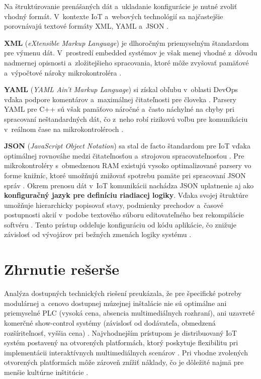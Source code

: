 Na štruktúrovanie prenášaných dát a~ukladanie konfigurácie
je nutné zvoliť vhodný formát. V~kontexte IoT a~webových
technológií sa najčastejšie porovnávajú textové formáty XML,
YAML a~JSON \cite{iot_data_formats_review}.

\textbf{XML} (\textit{eXtensible Markup Language}) je dlhoročným
priemyselným štandardom pre výmenu dát. V~prostredí embedded
systémov je však menej vhodné z~dôvodu nadmernej opisnosti
a~zložitejšieho spracovania, ktoré môže zvyšovať pamäťové
a~výpočtové nároky mikrokontroléra \cite{iot_data_formats_review}.

\textbf{YAML} (\textit{YAML Ain't Markup Language}) si získal
obľubu v~oblasti DevOps vďaka podpore komentárov
a~maximálnej čitateľnosti pre človeka \cite{yaml_vs_json}.
Parsery YAML pre C++ sú však pamäťovo náročné a~často
náchylné na chyby pri spracovaní neštandardných dát, čo z~neho
robí rizikovú voľbu pre komunikáciu v~reálnom čase na
mikrokontroléroch \cite{json_xml}.

\textbf{JSON} (\textit{JavaScript Object Notation}) sa stal de facto
štandardom pre IoT vďaka optimálnej rovnováhe medzi
čitateľnosťou a~strojovou spracovateľnosťou
\cite{iot_data_formats_review}. Pre mikrokontroléry
s~obmedzenou RAM existujú vysoko optimalizované parsery vo forme knižníc,
ktoré umožňujú znižovať spotrebu pamäte pri spracovaní
JSON správ \cite{arduinojson_reduce_memory}. Okrem prenosu
dát v~IoT komunikácii nachádza JSON uplatnenie aj ako
\textbf{konfiguračný jazyk pre definíciu riadiacej logiky}.
Vďaka svojej štruktúre umožňuje hierarchicky
popisovať stavy, podmienky prechodov a~časové postupnosti
akcií v~podobe textového súboru editovateľného bez
rekompilácie softvéru \cite{iot_data_formats_review}.
Tento prístup oddeľuje konfiguráciu od kódu aplikácie,
čo znižuje závislosť od vývojárov pri bežných zmenách
logiky systému \cite{iot_data_formats_review}.

\section{Zhrnutie rešerše}
\label{zhrnutie-reserse}

Analýza dostupných technických riešení preukázala, že pre
špecifické potreby modulárnej a~cenovo dostupnej múzejnej
inštalácie nie sú optimálne ani priemyselné PLC (vysoká
cena, absencia multimediálnych rozhraní), ani uzavreté
komerčné show-control systémy (závislosť od dodávateľa,
obmedzená rozšíriteľnosť, vyššia cena) \cite{iec61131, john2010plc, huntington2017}.
Najvhodnejším prístupom je distribuovaný IoT systém
postavený na otvorených platformách, ktorý poskytuje
flexibilitu pri implementácii interaktívnych multimediálnych
scenárov \cite{computational_frameworks_art}. Pri vhodne
zvolených otvorených platformách môže zároveň znížiť náklady,
čo je dôležité najmä pre menšie kultúrne inštitúcie
\cite{interactive_small_museums}.


